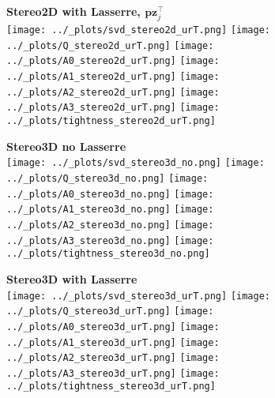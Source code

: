 \documentclass[11pt]{article}
\newcommand{\vc}[1]{\ensuremath{\bm{#1}}}
\begin{document}
\begin{figure}[h]
  \centering
\textbf{\large{Stereo2D with Lasserre, $\vc{p}\vc{z}_j^\top$}} \\
  \vspace{2em}
  \texttt{[image: ../\_plots/svd\_stereo2d\_urT.png]}
  \texttt{[image: ../\_plots/Q\_stereo2d\_urT.png]}
  \texttt{[image: ../\_plots/A0\_stereo2d\_urT.png]}
  \texttt{[image: ../\_plots/A1\_stereo2d\_urT.png]}
  \texttt{[image: ../\_plots/A2\_stereo2d\_urT.png]}
  \texttt{[image: ../\_plots/A3\_stereo2d\_urT.png]}
  \texttt{[image: ../\_plots/tightness\_stereo2d\_urT.png]}
\end{figure}


\begin{figure}[h]
  \centering
  \textbf{\large{Stereo3D no Lasserre}} \\
  \vspace{2em}
  \texttt{[image: ../\_plots/svd\_stereo3d\_no.png]}
  \texttt{[image: ../\_plots/Q\_stereo3d\_no.png]}
  \texttt{[image: ../\_plots/A0\_stereo3d\_no.png]}
  \texttt{[image: ../\_plots/A1\_stereo3d\_no.png]}
  \texttt{[image: ../\_plots/A2\_stereo3d\_no.png]}
  \texttt{[image: ../\_plots/A3\_stereo3d\_no.png]}
  \texttt{[image: ../\_plots/tightness\_stereo3d\_no.png]}
\end{figure}

\begin{figure}[h]
  \centering
  \textbf{\large{Stereo3D with Lasserre}} \\
  \vspace{2em}
  \texttt{[image: ../\_plots/svd\_stereo3d\_urT.png]}
  \texttt{[image: ../\_plots/Q\_stereo3d\_urT.png]}
  \texttt{[image: ../\_plots/A0\_stereo3d\_urT.png]}
  \texttt{[image: ../\_plots/A1\_stereo3d\_urT.png]}
  \texttt{[image: ../\_plots/A2\_stereo3d\_urT.png]}
  \texttt{[image: ../\_plots/A3\_stereo3d\_urT.png]}
  \texttt{[image: ../\_plots/tightness\_stereo3d\_urT.png]}
\end{figure}
\end{document}
